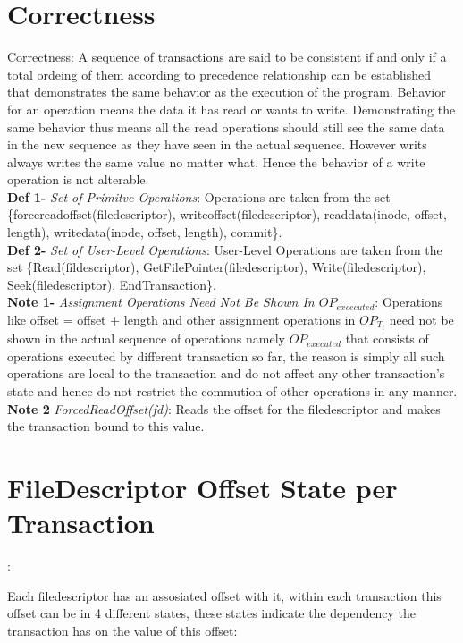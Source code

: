 \documentclass[a4paper, 11pt]{article}
\begin{document}
\section{Correctness}

{Correctness}: A sequence of transactions are said to be consistent if and only if a total ordeing of them according to precedence relationship can be established that demonstrates the same behavior as the execution of the program. Behavior for an operation means the data it has read or wants to write. Demonstrating the same behavior thus means all the read operations should still see the same data in the new sequence as they have seen in the actual sequence. However writs always writes the same value no matter what. Hence the behavior of a write operation is not alterable.\\

\textbf{Def 1-} \emph{Set of Primitve Operations}: Operations are taken from the set \{forcereadoffset(filedescriptor), writeoffset(filedescriptor), readdata(inode, offset, length), writedata(inode, offset, length), commit\}.\\

\textbf{Def 2-} \emph{Set of User-Level Operations}: User-Level Operations are taken from the set \{Read(fildescriptor), GetFilePointer(filedescriptor), Write(filedescriptor), Seek(filedescriptor), EndTransaction\}.\\

\textbf{Note 1-} \emph{Assignment Operations Need Not Be Shown In $OP_{excecuted}$}: Operations like offset = offset + length and other assignment operations in $OP_{T_i}$ need not be shown in the actual sequence of operations namely $OP_{executed}$ that consists of operations executed by different transaction so far, the reason is simply all such operations are local to the transaction and do not affect any other transaction's state and hence do not restrict the commution of other operations in any manner.\\

\textbf{Note 2} \emph{ForcedReadOffset(fd)}: Reads the offset for the filedescriptor and makes the transaction bound to this value.\\

\section{FileDescriptor Offset State per Transaction}:

Each filedescriptor has an assosiated offset with it, within each transaction this offset can be in 4 different states, these states indicate the dependency the transaction has on the value of this offset:\\
\end{document}
